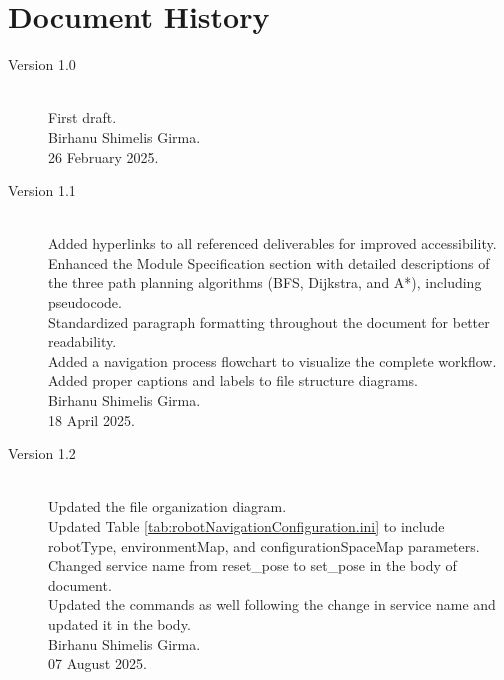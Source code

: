 \documentclass{CSSRforAfrica}
\begin{document}
\newpage
\section*{Document History}
\label{document_history}

\begin{description}
	
	\item [Version 1.0]~\\
	First draft. \\
	Birhanu Shimelis Girma. \\
	26 February 2025.
	
	\item [Version 1.1]~\\
	Added hyperlinks to all referenced deliverables for improved accessibility. \\
	Enhanced the Module Specification section with detailed descriptions of the three path planning algorithms (BFS, Dijkstra, and A*), including pseudocode. \\
	Standardized paragraph formatting throughout the document for better readability. \\
	Added a navigation process flowchart to visualize the complete workflow. \\
	Added proper captions and labels to file structure diagrams. \\
	Birhanu Shimelis Girma. \\
	18 April 2025.
		
	\item [Version 1.2]~\\
	Updated the file organization diagram. \\
	Updated Table \ref{tab:robotNavigationConfiguration.ini} to include robotType, environmentMap, and configurationSpaceMap parameters.\\
	Changed service name from reset\_pose to set\_pose in the body of document. \\
	Updated the commands as well following the change in service name and updated it in the body. \\
	Birhanu Shimelis Girma. \\
	07 August 2025.

\end{description}
\end{document}
